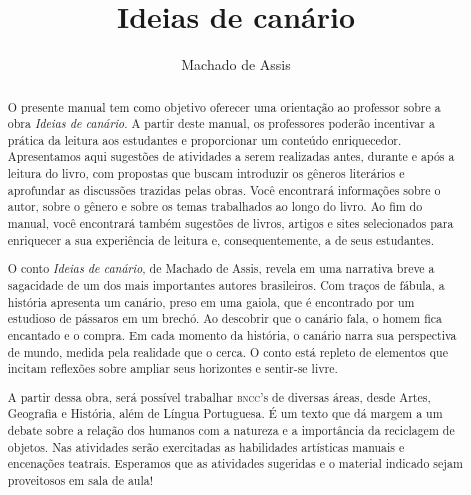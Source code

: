 \documentclass[11pt]{extarticle}
\newcommand{\AutorLivro}{Machado de Assis}
\newcommand{\TituloLivro}{Ideias de canário}
\newcommand{\colaborador}{Ana Lancman}
\begin{document}
\title{\TituloLivro}
\author{\AutorLivro}
\def\authornotes{\colaborador}

\date{}
\maketitle


\tableofcontents


\begin{abstract}

O presente manual tem como objetivo oferecer uma orientação ao professor sobre a obra \textit{Ideias de canário}. A partir deste manual, os professores poderão incentivar a prática da leitura aos estudantes e proporcionar um conteúdo enriquecedor. Apresentamos aqui sugestões de atividades a serem realizadas antes, durante e após a leitura do livro, com propostas que buscam introduzir os gêneros literários e aprofundar as discussões trazidas pelas obras. Você encontrará informações sobre o autor, sobre o gênero e sobre os temas trabalhados ao longo do livro. Ao fim do manual, você encontrará também sugestões de livros, artigos e sites selecionados para enriquecer a sua experiência de leitura e, consequentemente, a de seus estudantes.

O conto \textit{Ideias de canário}, de Machado de Assis, revela em uma narrativa breve a sagacidade de um dos mais importantes autores brasileiros. Com traços de fábula, a história apresenta um canário, preso em uma gaiola, que é encontrado por um estudioso de pássaros em um brechó. Ao descobrir que o canário fala, o homem fica encantado e o compra. Em cada momento da história, o canário narra sua perspectiva de mundo, medida pela realidade que o cerca. O conto está repleto de elementos que incitam reflexões sobre ampliar seus horizontes e sentir-se livre.

A partir dessa obra, será possível trabalhar \textsc{bncc}'s de diversas áreas, desde Artes, Geografia e História, além de Língua Portuguesa. É um texto que dá margem a um debate sobre a relação dos humanos com a natureza e a importância da reciclagem de objetos. Nas atividades serão exercitadas as habilidades artísticas manuais e encenações teatrais. Esperamos que as atividades sugeridas e o material indicado sejam proveitosos em sala de aula! 

\end{abstract}
\end{document}
